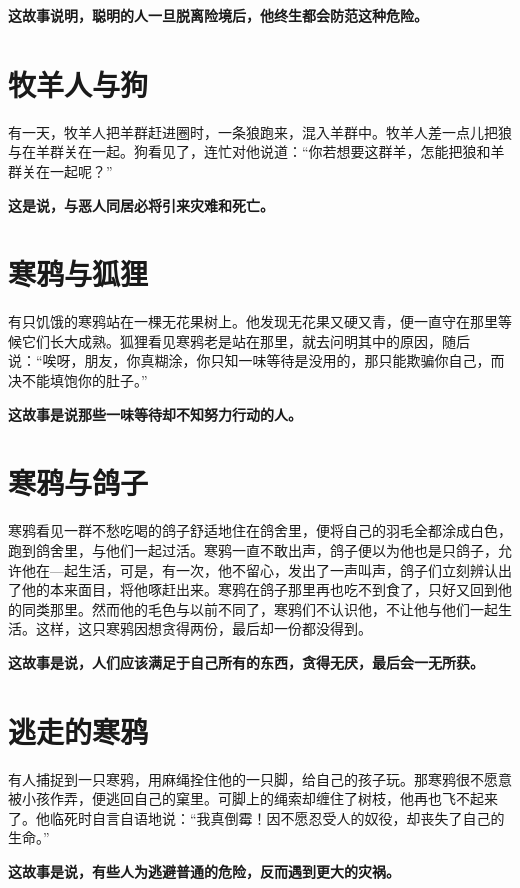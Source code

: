 {\bfseries \color{red}这故事说明，聪明的人一旦脱离险境后，他终生都会防范这种危险。}

\section{牧羊人与狗}

有一天，牧羊人把羊群赶进圈时，一条狼跑来，混入羊群中。牧羊人差一点儿把狼与在羊群关在一起。狗看见了，连忙对他说道：“你若想要这群羊，怎能把狼和羊群关在一起呢？”

{\bfseries \color{red}这是说，与恶人同居必将引来灾难和死亡。}

\section{寒鸦与狐狸}

有只饥饿的寒鸦站在一棵无花果树上。他发现无花果又硬又青，便一直守在那里等候它们长大成熟。狐狸看见寒鸦老是站在那里，就去问明其中的原因，随后说：“唉呀，朋友，你真糊涂，你只知一味等待是没用的，那只能欺骗你自己，而决不能填饱你的肚子。”

{\bfseries \color{red}这故事是说那些一味等待却不知努力行动的人。}

\section{寒鸦与鸽子}

寒鸦看见一群不愁吃喝的鸽子舒适地住在鸽舍里，便将自己的羽毛全都涂成白色，跑到鸽舍里，与他们一起过活。寒鸦一直不敢出声，鸽子便以为他也是只鸽子，允许他在—起生活，可是，有一次，他不留心，发出了一声叫声，鸽子们立刻辨认出了他的本来面目，将他啄赶出来。寒鸦在鸽子那里再也吃不到食了，只好又回到他的同类那里。然而他的毛色与以前不同了，寒鸦们不认识他，不让他与他们一起生活。这样，这只寒鸦因想贪得两份，最后却一份都没得到。

{\bfseries \color{red}这故事是说，人们应该满足于自己所有的东西，贪得无厌，最后会一无所获。}

\section{逃走的寒鸦}

有人捕捉到一只寒鸦，用麻绳拴住他的一只脚，给自己的孩子玩。那寒鸦很不愿意被小孩作弄，便逃回自己的窠里。可脚上的绳索却缠住了树枝，他再也飞不起来了。他临死时自言自语地说：“我真倒霉！因不愿忍受人的奴役，却丧失了自己的生命。”

{\bfseries \color{red}这故事是说，有些人为逃避普通的危险，反而遇到更大的灾祸。}

